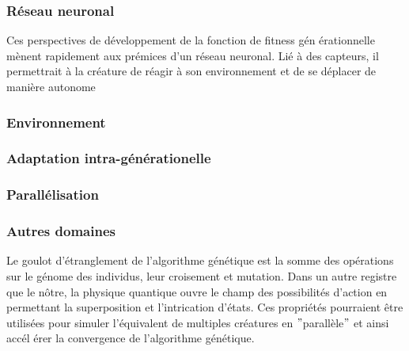 \documentclass[journal, a4paper]{IEEEtran}
\begin{document}
	\subsubsection{Réseau neuronal}
	Ces perspectives de développement de la fonction de fitness gén
	érationnelle
	mènent rapidement aux prémices d'un réseau neuronal.
	Lié à des capteurs, il permettrait à la créature de réagir
	à son environnement et de se déplacer de manière autonome

	\subsubsection{Environnement}

	\subsubsection{Adaptation intra-générationelle}

	\subsubsection{Parallélisation}

	\subsubsection{Autres domaines}
	Le goulot d'étranglement de l'algorithme génétique est la somme
	des opérations sur le génome des individus, leur croisement et
	mutation.
	Dans un autre registre que le nôtre, la physique quantique ouvre le
	champ	des
	possibilités d'action en permettant la superposition et
	l'intrication
	d'états. Ces propriétés pourraient être utilisées pour simuler
	l'équivalent de multiples créatures en \("\)parallèle\("\) et ainsi accél
	érer la convergence
	de l'algorithme génétique.\cite{quantum-computing}
\end{document}
